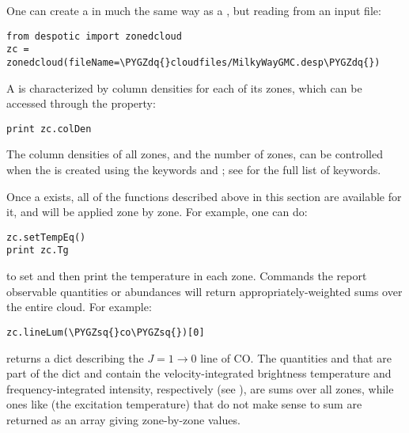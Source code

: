 \documentclass[letterpaper,10pt,english]{sphinxmanual}
\def\PYGZsq{\char`\'}
\def\PYGZdq{\char`\"}
\renewcommand\PYGZsq{\textquotesingle}
\begin{document}
One can create a  in much the same way as a ,
but reading from an input file:

\begin{Verbatim}[commandchars=\\\{\}]
from despotic import zonedcloud
zc = zonedcloud(fileName=\PYGZdq{}cloudfiles/MilkyWayGMC.desp\PYGZdq{})
\end{Verbatim}

A  is characterized by column densities for each of its
zones, which can be accessed through the  property:

\begin{Verbatim}[commandchars=\\\{\}]
print zc.colDen
\end{Verbatim}

The column densities of all zones, and the number of zones, can be
controlled when the  is created using the keywords
 and ; see {\hyperref[fulldoc:sssec\string-full\string-zonedcloud]{}} for the
full list of keywords.

Once a  exists, all of the functions described above in
this section are available for it, and will be applied zone by
zone. For example, one can do:

\begin{Verbatim}[commandchars=\\\{\}]
zc.setTempEq()
print zc.Tg
\end{Verbatim}

to set and then print the temperature in each zone. Commands the
report observable quantities or abundances will return
appropriately-weighted sums over the entire cloud. For example:

\begin{Verbatim}[commandchars=\\\{\}]
zc.lineLum(\PYGZsq{}co\PYGZsq{})[0]
\end{Verbatim}

returns a dict describing the \(J=1\rightarrow 0\) line of CO. The
quantities  and  that are part of the dict
and contain the velocity-integrated brightness temperature and
frequency-integrated intensity, respectively (see
{\hyperref[functions:ssec\string-line\string-emission]{}}), are sums over all zones, while ones
like  (the excitation temperature) that do not make sense to
sum are returned as an array giving zone-by-zone values.
\end{document}
